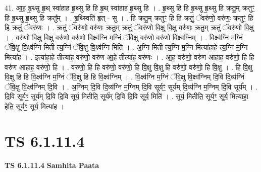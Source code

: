 \documentclass[17pt]{extarticle}
\begin{document}
41. आ॒ह॒ हृ॒थ्सु हृ॒थ् स्वा॑हाह हृ॒थ्सु हि हि हृ॒थ् स्वा॑हाह हृ॒थ्सु हि । . हृ॒थ्सु हि हि हृ॒थ्सु हृ॒थ्सु हि क्रतु॒म् क्रतुꣳ॒॒ हि हृ॒थ्सु हृ॒थ्सु हि क्रतु᳚म् । . हृ॒थ्स्विति॑ हृत् - सु । . हि क्रतु॒म् क्रतुꣳ॒॒ हि हि क्रतुं॒ ॅवरु॑णो॒ वरु॑णः॒ क्रतुꣳ॒॒ हि हि क्रतुं॒ ॅवरु॑णः । . क्रतुं॒ ॅवरु॑णो॒ वरु॑णः॒ क्रतु॒म् क्रतुं॒ ॅवरु॑णो वि॒क्षु वि॒क्षु वरु॑णः॒ क्रतु॒म् क्रतुं॒ ॅवरु॑णो वि॒क्षु । . वरु॑णो वि॒क्षु वि॒क्षु वरु॑णो॒ वरु॑णो वि॒क्ष्व॑ग्नि म॒ग्निं ॅवि॒क्षु वरु॑णो॒ वरु॑णो वि॒क्ष्व॑ग्निम् । . वि॒क्ष्व॑ग्नि म॒ग्निं ॅवि॒क्षु वि॒क्ष्व॑ग्नि मिती त्य॒ग्निं ॅवि॒क्षु वि॒क्ष्व॑ग्नि मिति॑ । . अ॒ग्नि मिती त्य॒ग्नि म॒ग्नि मित्या॑हा॒हे त्य॒ग्नि म॒ग्नि मित्या॑ह । . इत्या॑हा॒हे तीत्या॑ह॒ वरु॑णो॒ वरु॑ण आ॒हे तीत्या॑ह॒ वरु॑णः । . आ॒ह॒ वरु॑णो॒ वरु॑ण आहाह॒ वरु॑णो॒ हि हि वरु॑ण आहाह॒ वरु॑णो॒ हि । . वरु॑णो॒ हि हि वरु॑णो॒ वरु॑णो॒ हि वि॒क्षु वि॒क्षु हि वरु॑णो॒ वरु॑णो॒ हि वि॒क्षु । . हि वि॒क्षु वि॒क्षु हि हि वि॒क्ष्व॑ग्नि म॒ग्निं ॅवि॒क्षु हि हि वि॒क्ष्व॑ग्निम् । . वि॒क्ष्व॑ग्नि म॒ग्निं ॅवि॒क्षु वि॒क्ष्व॑ग्निम् दि॒वि दि॒व्य॑ग्निं ॅवि॒क्षु वि॒क्ष्व॑ग्निम् दि॒वि । . अ॒ग्निम् दि॒वि दि॒व्य॑ग्नि म॒ग्निम् दि॒वि सूर्यꣳ॒॒ सूर्य॑म् दि॒व्य॑ग्नि म॒ग्निम् दि॒वि सूर्य᳚म् । . दि॒वि सूर्यꣳ॒॒ सूर्य॑म् दि॒वि दि॒वि सूर्य॒ मितीति॒ सूर्य॑म् दि॒वि दि॒वि सूर्य॒ मिति॑ । . सूर्य॒ मितीति॒ सूर्यꣳ॒॒ सूर्य॒ मित्या॑हा॒ हेति॒ सूर्यꣳ॒॒ सूर्य॒ मित्या॑ह । \newline
\pagebreak
{}

\section{ TS 6.1.11.4 }

\textbf{TS 6.1.11.4 } \newline
\textbf{Samhita Paata} \newline
\end{document}
